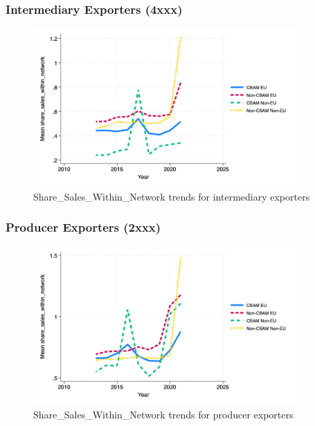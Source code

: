 \documentclass{article}
\begin{document}
\subsubsection{Intermediary Exporters (4xxx)}
\begin{figure}[h!]
\centering
\includegraphics[width=0.9\textwidth]{share_sales_within_network_ei.png}
\caption{Share_Sales_Within_Network trends for intermediary exporters}
\label{fig:share_sales_within_network_ei}
\end{figure}

\subsubsection{Producer Exporters (2xxx)}
\begin{figure}[h!]
\centering
\includegraphics[width=0.9\textwidth]{share_sales_within_network_ep.png}
\caption{Share_Sales_Within_Network trends for producer exporters}
\label{fig:share_sales_within_network_ep}
\end{figure}
\end{document}
